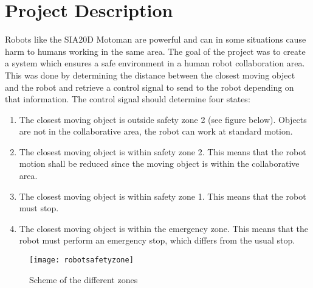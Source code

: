
\section{Project Description}
Robots like the SIA20D Motoman are powerful and can in some situations cause harm to humans working in the same area. The goal of the project was to create a system which ensures a safe environment in a human robot collaboration area. This was done by determining the distance between the closest moving object and the robot and retrieve a control signal to send to the robot depending on that information. The control signal should determine four states:
\begin{enumerate}
\item The closest moving object is outside safety zone 2 (see figure below). Objects are not in the collaborative area, the robot can work at standard motion. 

\item The closest moving object is within safety zone 2. This means that the robot motion shall be reduced since the moving object is within the collaborative area.

\item The closest moving object is within safety zone 1. This means that the robot must stop.

\item The closest moving object is within the emergency zone. This means that the robot must perform an emergency stop, which differs from the usual stop. 
\end{enumerate}

\begin{figure}[H]
\begin{center}
\texttt{[image: robotsafetyzone]}
\caption{Scheme of the different zones}
\label{robotsafetyzone}
\end{center}
\end{figure}
